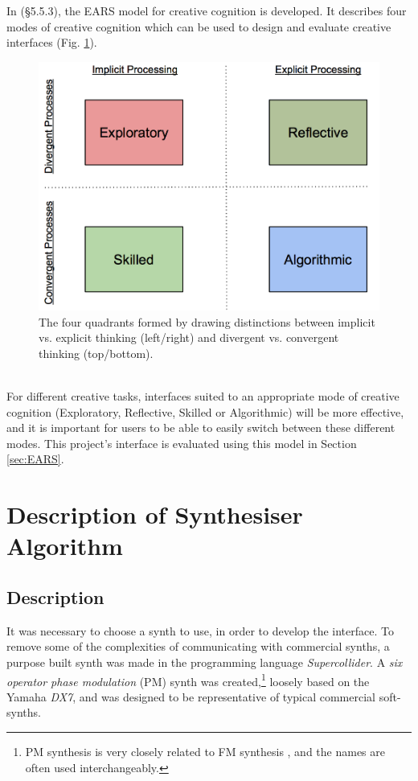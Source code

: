 \documentclass[11pt, oneside]{report}   	%
\begin{document}
In \cite{TubbThesis}(\S 5.5.3), the EARS model for creative cognition is developed. It describes four modes of creative cognition which can be used to design and evaluate creative interfaces (Fig. \ref{fig:EARSmodel}).
\begin{figure}[h] 
	\centering
	\includegraphics[width = 5in]{EARSmodel.png}
	\caption{The four quadrants formed by drawing distinctions between implicit vs. explicit thinking (left/right) and divergent vs. convergent thinking (top/bottom). \cite{TubbThesis}}
	\label{fig:EARSmodel}
\end{figure}\\
For different creative tasks, interfaces suited to an appropriate mode of creative cognition (Exploratory, Reflective, Skilled or Algorithmic) will be more effective, and it is important for users to be able to easily switch between these different modes. This project's interface is evaluated using this model in Section \ref{sec:EARS}.


\chapter{Description of Synthesiser Algorithm}
\section{Description}
 It was necessary to choose a synth to use, in order to develop the interface. To remove some of the complexities of communicating with commercial synths, a purpose built synth was made in the programming language \emph{Supercollider}.
A \emph{six operator phase modulation} (PM) synth was created,\footnote{PM synthesis is very closely related to FM synthesis \cite{FM}, and the names are often used interchangeably.} loosely based on the Yamaha \emph{DX7}, and was designed to be representative of typical commercial soft-synths.
 
\end{document}

